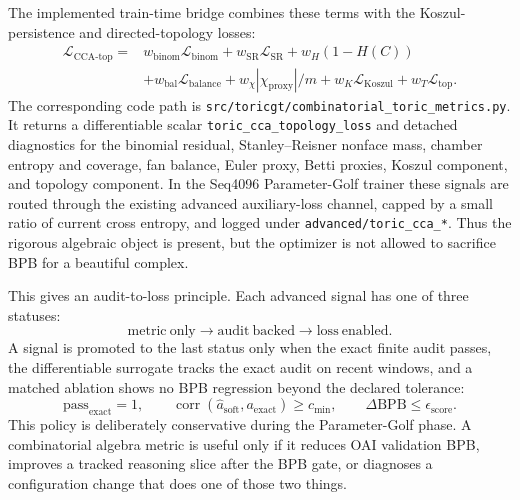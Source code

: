 \documentclass[11pt]{article}
\theoremstyle{definition}
\theoremstyle{plain}
\theoremstyle{remark}
\numberwithin{equation}{section}
\begin{document}
The implemented train-time bridge combines these terms with the Koszul-persistence and directed-topology losses:
\begin{equation}
\begin{split}
  \mathcal L_{\mathrm{CCA}\text{-}\mathrm{top}}
  ={}&
  w_{\mathrm{binom}}\mathcal L_{\mathrm{binom}}
  +w_{\mathrm{SR}}\mathcal L_{\mathrm{SR}}
  +w_H(1-H(C))\\
  &+w_{\mathrm{bal}}\mathcal L_{\mathrm{balance}}
  +w_\chi|\chi_{\mathrm{proxy}}|/m
  +w_K\mathcal L_{\mathrm{Koszul}}
  +w_T\mathcal L_{\mathrm{top}}.
\end{split}
\end{equation}
The corresponding code path is \texttt{src/toricgt/combinatorial\_toric\_metrics.py}.  It returns a differentiable scalar \texttt{toric\_cca\_topology\_loss} and detached diagnostics for the binomial residual, Stanley--Reisner nonface mass, chamber entropy and coverage, fan balance, Euler proxy, Betti proxies, Koszul component, and topology component.  In the Seq4096 Parameter-Golf trainer these signals are routed through the existing advanced auxiliary-loss channel, capped by a small ratio of current cross entropy, and logged under \texttt{advanced/toric\_cca\_*}.  Thus the rigorous algebraic object is present, but the optimizer is not allowed to sacrifice BPB for a beautiful complex.

This gives an audit-to-loss principle.  Each advanced signal has one of three statuses:
\begin{equation}
  \mathrm{metric\ only}\longrightarrow
  \mathrm{audit\ backed}\longrightarrow
  \mathrm{loss\ enabled}.
\end{equation}
A signal is promoted to the last status only when the exact finite audit passes, the differentiable surrogate tracks the exact audit on recent windows, and a matched ablation shows no BPB regression beyond the declared tolerance:
\begin{equation}
  \mathrm{pass}_{\mathrm{exact}}=1,\qquad
  \operatorname{corr}(\widehat a_{\mathrm{soft}},a_{\mathrm{exact}})\ge c_{\min},\qquad
  \Delta\mathrm{BPB}\le \epsilon_{\mathrm{score}}.
\end{equation}
This policy is deliberately conservative during the Parameter-Golf phase.  A combinatorial algebra metric is useful only if it reduces OAI validation BPB, improves a tracked reasoning slice after the BPB gate, or diagnoses a configuration change that does one of those two things.
\end{document}
